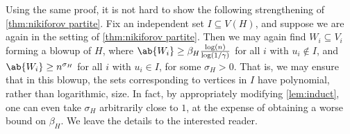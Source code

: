 \begin{remark}
    Using the same proof, it is not hard to show the following strengthening of \cref{thm:nikiforov partite}. Fix an independent set $I \subseteq V(H)$, and suppose we are again in the setting of \cref{thm:nikiforov partite}. Then we may again find $W_i \subseteq V_i$ forming a blowup of $H$, where $\ab{W_i} \geq \beta_H \frac{\log(n)}{\log(1/\gamma)}$ for all $i$ with $u_i \notin I$, and $\ab{W_i}\geq n^{\sigma_H}$ for all $i$ with $u_i \in I$, for some $\sigma_H>0$. That is, we may ensure that in this blowup, the sets corresponding to vertices in $I$ have polynomial, rather than logarithmic, size. In fact, by appropriately modifying \cref{lem:induct}, one can even take $\sigma_H$ arbitrarily close to $1$, at the expense of obtaining a worse bound on $\beta_H$. We leave the details to the interested reader.
\end{remark}



